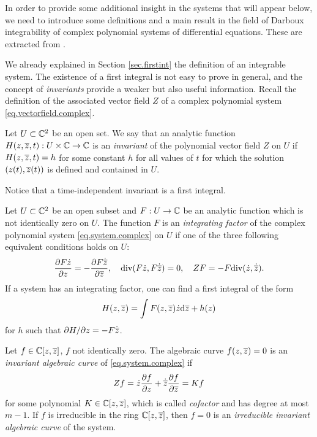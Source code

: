 In order to provide some additional insight in the systems that will appear below, we need to introduce some definitions and a main result in the field of Darboux integrability of complex polynomial systems of differential equations. These are extracted from \textcite{Dumortier2006}.

We already explained in Section \ref{sec.firstint} the definition of an integrable system. The existence of a first integral is not easy to prove in general, and the concept of \emph{invariants} provide a weaker but also useful information. Recall the definition of the associated vector field $Z$ of a complex polynomial system \eqref{eq.vectorfield.complex}.
\begin{definicio}
Let $U\subset\mathbb{C}^2$ be an open set. We say that an analytic function $H(z,\overline{z},t):U\times\mathbb{C}\to\mathbb{C}$ is an \emph{invariant} of the polynomial vector field $Z$ on $U$ if $H(z,\overline{z},t)=h$ for some constant $h$ for all values of $t$ for which the solution $(z(t),\overline{z}(t))$ is defined and contained in $U$.
\end{definicio}
Notice that a time-independent invariant is a first integral.

\begin{definicio}
Let $U\subset\mathbb{C}^2$ be an open subset and $F:U\to\mathbb{C}$ be an analytic function which is not identically zero on $U$. The function $F$ is an \emph{integrating factor} of the complex polynomial system \eqref{eq.system.complex} on $U$ if one of the three following equivalent conditions holds on $U$:
\begin{align}
\frac{\partial{F\dot z}}{\partial{z}}=-\frac{\partial{F\dot{\overline{z}}}}{\partial{\overline{z}}},\quad\mathrm{div}(F\dot z,F\dot{\overline{z}})=0,\quad ZF=-F\mathrm{div}(\dot z,\dot{\overline{z}}).
\end{align}
If a system has an integrating factor, one can find a first integral of the form
\begin{align}
H(z,\overline{z})=\int F(z,\overline{z})\dot z\mathrm{d}\overline{z}+h(z)
\end{align}
for $h$ such that $\partial H/\partial z=-F\dot{\overline{z}}$.
\end{definicio}

\begin{definicio}
Let $f\in\mathbb{C}[z,\overline{z}]$, $f$ not identically zero. The algebraic curve $f(z,\overline{z})=0$ is an \emph{invariant algebraic curve} of \eqref{eq.system.complex} if
\begin{align}
Zf=\dot z\frac{\partial{f}}{\partial{z}}+\dot{\overline{z}}\frac{\partial{f}}{\partial{\overline{z}}}=Kf
\label{eq.invalg}
\end{align}
for some polynomial $K\in\mathbb{C}[z,\overline{z}]$, which is called \emph{cofactor} and has degree at most $m-1$. If $f$ is irreducible in the ring $\mathbb{C}[z,\overline{z}]$, then $f=0$ is an \emph{irreducible invariant algebraic curve} of the system.
\end{definicio}

